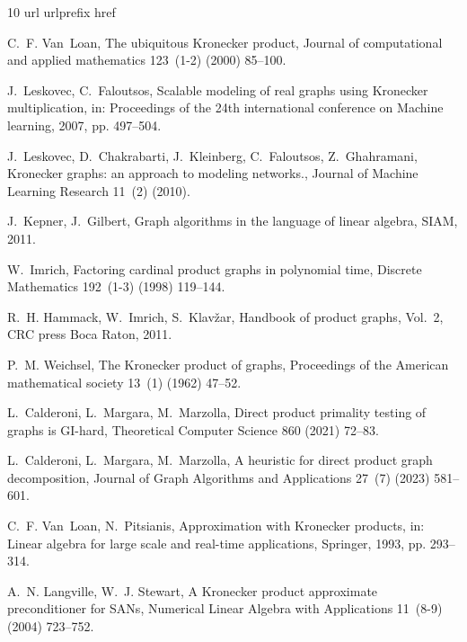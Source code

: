 \documentclass{article}
\numberwithin{equation}{section}
\theoremstyle{definition}
\begin{document}
\begin{thebibliography}{10}
\expandafter\ifx\csname url\endcsname\relax
  \def\url#1{\texttt{#1}}\fi
\expandafter\ifx\csname urlprefix\endcsname\relax\def\urlprefix{URL }\fi
\expandafter\ifx\csname href\endcsname\relax
  \def\href#1#2{#2} \def\path#1{#1}\fi

C.~F. Van~Loan, {The ubiquitous Kronecker product}, Journal of computational and applied mathematics 123~(1-2) (2000) 85--100.

J.~Leskovec, C.~Faloutsos, {Scalable modeling of real graphs using Kronecker multiplication}, in: Proceedings of the 24th international conference on Machine learning, 2007, pp. 497--504.

J.~Leskovec, D.~Chakrabarti, J.~Kleinberg, C.~Faloutsos, Z.~Ghahramani, {Kronecker graphs: an approach to modeling networks.}, Journal of Machine Learning Research 11~(2) (2010).

J.~Kepner, J.~Gilbert, {Graph algorithms in the language of linear algebra}, SIAM, 2011.

W.~Imrich, {Factoring cardinal product graphs in polynomial time}, Discrete Mathematics 192~(1-3) (1998) 119--144.

R.~H. Hammack, W.~Imrich, S.~Klav{\v{z}}ar, {Handbook of product graphs}, Vol.~2, CRC press Boca Raton, 2011.

P.~M. Weichsel, {The Kronecker product of graphs}, Proceedings of the American mathematical society 13~(1) (1962) 47--52.

L.~Calderoni, L.~Margara, M.~Marzolla, {Direct product primality testing of graphs is GI-hard}, Theoretical Computer Science 860 (2021) 72--83.

L.~Calderoni, L.~Margara, M.~Marzolla, {A heuristic for direct product graph decomposition}, Journal of Graph Algorithms and Applications 27~(7) (2023) 581--601.

C.~F. Van~Loan, N.~Pitsianis, {Approximation with Kronecker products}, in: Linear algebra for large scale and real-time applications, Springer, 1993, pp. 293--314.

A.~N. Langville, W.~J. Stewart, {A Kronecker product approximate preconditioner for SANs}, Numerical Linear Algebra with Applications 11~(8-9) (2004) 723--752.


\end{thebibliography}
\end{document}
